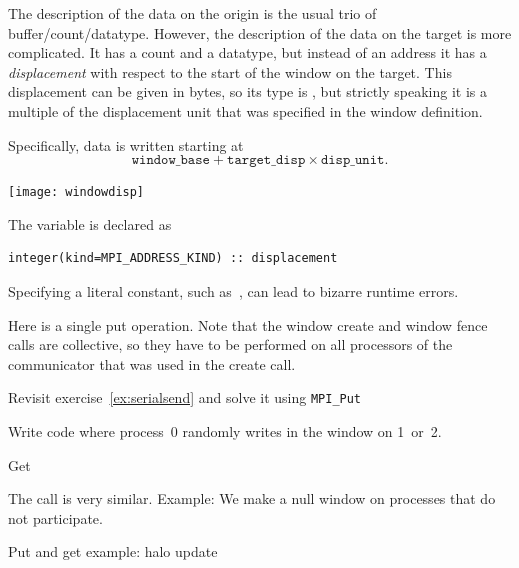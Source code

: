 The description of the data on the origin is the usual trio of
buffer/count/datatype. However, the description of the data on the
target is more complicated. It has a count and a datatype, but instead
of an address it has a
\emph{displacement} with respect to the
start of the window on the target. This displacement can be given in
bytes, so its type is , but strictly speaking
it is a multiple of the displacement unit that was specified in the
window definition.

Specifically, data is written starting at
\[ \mathtt{window\_base} + \mathtt{target\_disp}\times \mathtt{disp\_unit}. \]

\texttt{[image: windowdisp]}


\begin{fortrannote}
  The  variable is declared as 
\lstset{style=reviewcode,language=Fortran} %
\begin{lstlisting}
integer(kind=MPI_ADDRESS_KIND) :: displacement
\end{lstlisting}
\lstset{style=reviewcode,language=C} %
  Specifying a literal constant, such as~, can lead to bizarre
  runtime errors.
\end{fortrannote}

Here is a single put operation. Note that the window create and window fence calls
are collective, so they have to be performed on all processors
of the communicator that was used in the create call.

\begin{exercise}
  \label{ex:rightput}
  Revisit exercise~\ref{ex:serialsend} and solve it using
  \lstinline$MPI_Put$
\end{exercise}

\begin{exercise}
  \label{ex:randomput}
  Write code where process~0 randomly writes in the window on 1~or~2.
\end{exercise}

 {Get}

The  call is very similar.
%
%
Example:
%
%
We make a null window on processes that do not participate.
%

 {Put and get example: halo update}

